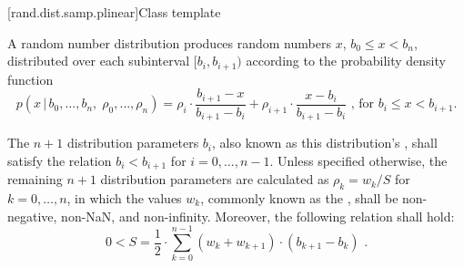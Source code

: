 [rand.dist.samp.plinear]{Class template }%
%
%

\pnum
A  random number distribution
produces random numbers $x$,
$b_0 \leq x < b_n$,
distributed over each subinterval
$[b_i, b_{i+1})$
according to the probability density function
%
%
\[ p(x \,|\, b_0, \dotsc, b_n, \; \rho_0, \dotsc, \rho_n)
     = \rho_{i}   \cdot {\frac{b_{i+1} - x}{b_{i+1} - b_i}}
     + \rho_{i+1} \cdot {\frac{x - b_i}{b_{i+1} - b_i}}
     \text{ , for $b_i \le x < b_{i+1}$.} \]

\pnum
The $n + 1$ distribution parameters $b_i$,
also known as this distribution's %
%
%
, shall satisfy the relation $b_i < b_{i+1}$ for $i = 0, \dotsc, n - 1$.
Unless specified otherwise,
the remaining $n + 1$ distribution parameters are calculated as
$\rho_k = {w_k / S}$ for $k = 0, \dotsc, n$, in which the values $w_k$,
commonly known as the %
%
%
, shall be non-negative, non-NaN, and non-infinity.
Moreover, the following relation shall hold:
\[ 0 < S = \frac{1}{2} \cdot \sum_{k=0}^{n-1} (w_k + w_{k+1}) \cdot (b_{k+1} - b_k) \text{ .} \]

